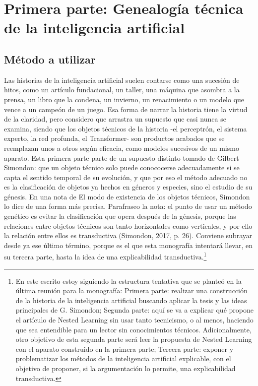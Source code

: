 \chapter*{Primera parte: Genealogía técnica de la inteligencia artificial}

\section*{Método a utilizar}

Las historias de la inteligencia artificial suelen contarse como una sucesión de hitos, como un artículo fundacional, un taller, una máquina que asombra a la prensa, un libro que la condena, un invierno, un renacimiento o un modelo que vence a un campeón de un juego. Esa forma de narrar la historia tiene la virtud de la claridad, pero considero que arrastra un supuesto que casi nunca se examina, siendo que los objetos técnicos de la historia -el perceptrón, el sistema experto, la red profunda, el Transformer- son productos acabados que se reemplazan unos a otros según eficacia, como modelos sucesivos de un mismo aparato. Esta primera parte parte de un supuesto distinto tomado de Gilbert Simondon: que un objeto técnico solo puede conococerse adecuadamente si se capta el sentido temporal de su evolución, y que por eso el método adecuado no es la clasificación de objetos ya hechos en géneros y especies, sino el estudio de su génesis. En una nota de El modo de existencia de los objetos técnicos, Simondon lo dice de una forma más precisa. Parafraseo la nota: el punto de usar un método genético es evitar la clasificación que opera después de la génesis, porque las relaciones entre objetos técnicos son tanto horizontales como verticales, y por ello la relación entre ellos es transductiva (Simondon, 2017, p. 26). Conviene subrayar desde ya ese último término, porque es el que esta monografía intentará llevar, en su tercera parte, hasta la idea de una explicabilidad transductiva.\footnote{En este escrito estoy siguiendo la estructura tentativa que se planteó en la última reunión para la monografía: Primera parte: realizar una construcción de la historia de la inteligencia artificial buscando aplicar la tesis y las ideas principales de G. Simondon; Segunda parte: aquí se va a explicar qué propone el artículo de Nested Learning sin usar tanto tecnicismo, o al menos, haciendo que sea entendible para un lector sin conocimientos técnicos. Adicionalmente, otro objetivo de esta segunda parte será leer la propuesta de Nested Learning con el aparato construido en la primera parte; Tercera parte: exponer y problematizar los métodos de la inteligencia artificial explicable, con el objetivo de proponer, si la argumentación lo permite, una explicabilidad transductiva.}

